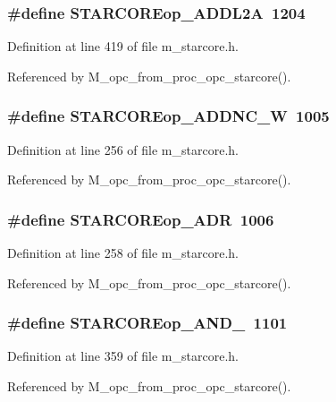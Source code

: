\subsubsection{\setlength{\rightskip}{0pt plus 5cm}\#define STARCOREop\_\-ADDL2A~1204}\label{m__starcore_8h_0f44d13c41350628192c25182ae50840}




Definition at line 419 of file m\_\-starcore.h.

Referenced by M\_\-opc\_\-from\_\-proc\_\-opc\_\-starcore().
\subsubsection{\setlength{\rightskip}{0pt plus 5cm}\#define STARCOREop\_\-ADDNC\_\-W~1005}\label{m__starcore_8h_d154fe1363f460d4c7e1f4ddce68d5f3}




Definition at line 256 of file m\_\-starcore.h.

Referenced by M\_\-opc\_\-from\_\-proc\_\-opc\_\-starcore().
\subsubsection{\setlength{\rightskip}{0pt plus 5cm}\#define STARCOREop\_\-ADR~1006}\label{m__starcore_8h_0b2247889a049e802e8892f5a5c50757}




Definition at line 258 of file m\_\-starcore.h.

Referenced by M\_\-opc\_\-from\_\-proc\_\-opc\_\-starcore().
\subsubsection{\setlength{\rightskip}{0pt plus 5cm}\#define STARCOREop\_\-AND\_~1101}\label{m__starcore_8h_d82f2d55f0e279d500e7d9bb5362df33}




Definition at line 359 of file m\_\-starcore.h.

Referenced by M\_\-opc\_\-from\_\-proc\_\-opc\_\-starcore().
